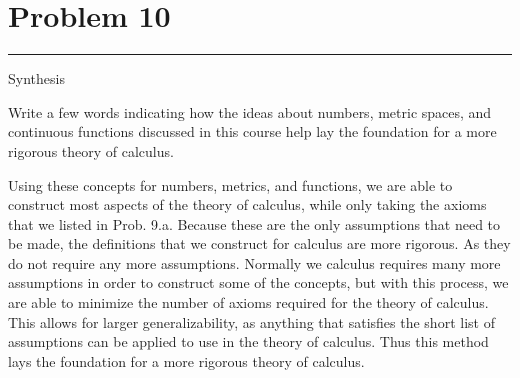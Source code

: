\documentclass[12pt]{amsart}
\newcommand{\usec}[1]{%
  \section*{#1}%
  \noindent\rule{\textwidth}{2pt}%
  \vspace{10pt}%
}
\newcommand{\gtodo}[1]{\todo[inline, color=green]{#1}}
\newcommand{\prob}[1]{Prob. #1}
\begin{document}
  \gtodo{More?}

  \usec{Problem 10}%
  \label{sec:problem_10}

  Synthesis

  Write a few words indicating how the ideas about numbers, metric spaces, and
  continuous functions discussed in this course help lay the foundation for a
  more rigorous theory of calculus.

  Using these concepts for numbers, metrics, and functions, we are able to
  construct most aspects of the theory of calculus, while only taking the axioms
  that we listed in \prob{9.a}. Because these are the only assumptions that need
  to be made, the definitions that we construct for calculus are more rigorous.
  As they do not require any more assumptions. Normally we calculus requires many
  more assumptions in order to construct some of the concepts, but with this
  process, we are able to minimize the number of axioms required for the theory
  of calculus. This allows for larger generalizability, as anything that
  satisfies the short list of assumptions can be applied to use in the theory of
  calculus. Thus this method lays the foundation for a more rigorous theory of
  calculus.

  \gtodo{Write More?}

  
\end{document}
